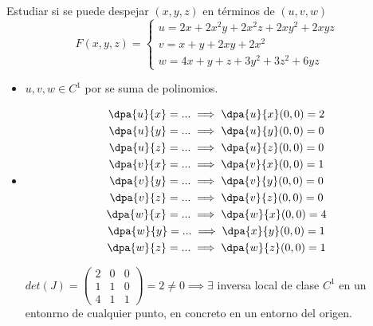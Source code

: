 \begin{problem}[6]
Estudiar si se puede despejar $(x,y,z)$ en términos de $(u,v,w)$ 
$$F(x,y,z) = \left\{\begin{matrix}u = 2x+2x^2y+2x^2z+2xy^2+2xyz\\v=x+y+2xy+2x^2\\w=4x+y+z+3y^2+3z^2+6yz\end{matrix}\right.$$
\solution
\begin{itemize}
 \item $u,v,w \in C^1$ por se suma de polinomios. 
 \item \begin{gather*}
\dpa{u}{x} = ... \implies \dpa{u}{x}(0,0) = 2\\
\dpa{u}{y} = ... \implies \dpa{u}{y}(0,0) = 0\\
\dpa{u}{z} = ... \implies \dpa{u}{z}(0,0) = 0\\
\dpa{v}{x} = ... \implies \dpa{v}{x}(0,0) = 1\\
\dpa{v}{y} = ... \implies \dpa{v}{y}(0,0) = 0\\
\dpa{v}{z} = ... \implies \dpa{v}{z}(0,0) = 0\\
\dpa{w}{x} = ... \implies \dpa{w}{x}(0,0) = 4\\
\dpa{w}{y} = ... \implies \dpa{x}{y}(0,0) = 1\\
\dpa{w}{z} = ... \implies \dpa{w}{z}(0,0) = 1
       \end{gather*}
       
   $det(J) =\begin{pmatrix}
             2&0&0\\
             1&1&0\\
             4&1&1
            \end{pmatrix}
 = 2 \neq 0 \implies \exists $ inversa local de clase $C^1$ en un entonrno de cualquier punto, en concreto en un entorno del origen.
\end{itemize}
\end{problem}


